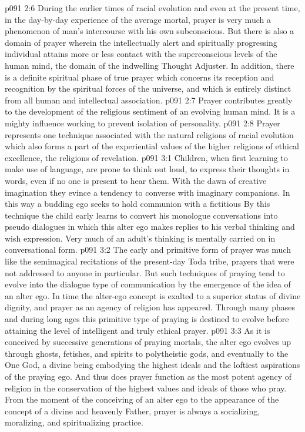 \vs p091 2:6 During the earlier times of racial evolution and even at the present time, in the day\hyp{}by\hyp{}day experience of the average mortal, prayer is very much a phenomenon of man’s intercourse with his own subconscious. But there is also a domain of prayer wherein the intellectually alert and spiritually progressing individual attains more or less contact with the superconscious levels of the human mind, the domain of the indwelling Thought Adjuster. In addition, there is a definite spiritual phase of true prayer which concerns its reception and recognition by the spiritual forces of the universe, and which is entirely distinct from all human and intellectual association.
\vs p091 2:7 Prayer contributes greatly to the development of the religious sentiment of an evolving human mind. It is a mighty influence working to prevent isolation of personality.
\vs p091 2:8 Prayer represents one technique associated with the natural religions of racial evolution which also forms a part of the experiential values of the higher religions of ethical excellence, the religions of revelation.
\vs p091 3:1 Children, when first learning to make use of language, are prone to think out loud, to express their thoughts in words, even if no one is present to hear them. With the dawn of creative imagination they evince a tendency to converse with imaginary companions. In this way a budding ego seeks to hold communion with a fictitious  By this technique the child early learns to convert his monologue conversations into pseudo dialogues in which this alter ego makes replies to his verbal thinking and wish expression. Very much of an adult’s thinking is mentally carried on in conversational form.
\vs p091 3:2 The early and primitive form of prayer was much like the semimagical recitations of the present\hyp{}day Toda tribe, prayers that were not addressed to anyone in particular. But such techniques of praying tend to evolve into the dialogue type of communication by the emergence of the idea of an alter ego. In time the alter\hyp{}ego concept is exalted to a superior status of divine dignity, and prayer as an agency of religion has appeared. Through many phases and during long ages this primitive type of praying is destined to evolve before attaining the level of intelligent and truly ethical prayer.
\vs p091 3:3 As it is conceived by successive generations of praying mortals, the alter ego evolves up through ghosts, fetishes, and spirits to polytheistic gods, and eventually to the One God, a divine being embodying the highest ideals and the loftiest aspirations of the praying ego. And thus does prayer function as the most potent agency of religion in the conservation of the highest values and ideals of those who pray. From the moment of the conceiving of an alter ego to the appearance of the concept of a divine and heavenly Father, prayer is always a socializing, moralizing, and spiritualizing practice.
